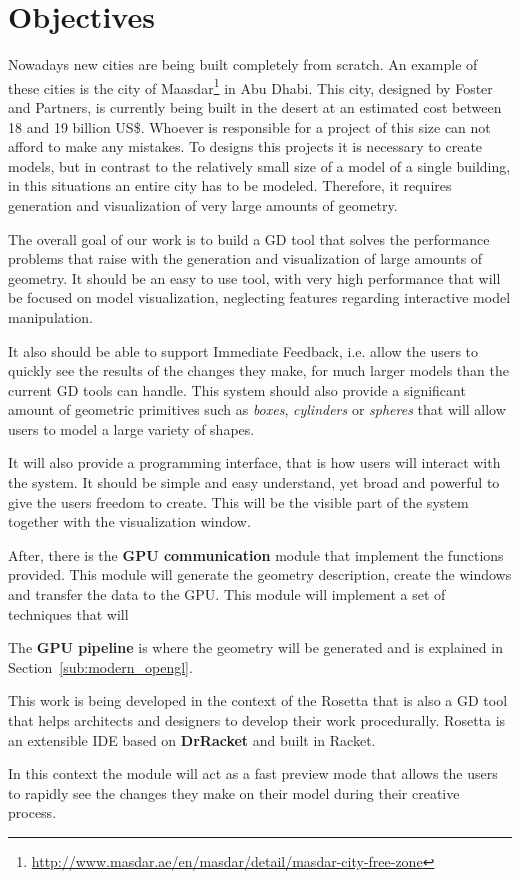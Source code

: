 
\section{Objectives} %
\label{sec:objectives}

Nowadays new cities are being built  completely from scratch. An example of these cities is the city of Maasdar\footnote{\url{http://www.masdar.ae/en/masdar/detail/masdar-city-free-zone}} in Abu Dhabi. This city, designed by Foster and Partners, is currently being built in the desert at an estimated cost between 18 and 19 billion US\$. Whoever is responsible for a project of this size can not afford to make any mistakes.
To designs this projects it is necessary to create models, but in contrast to the relatively small size of a model of a single building, in this situations an entire city has to be modeled. Therefore, it requires generation and visualization of very large amounts of geometry.

The overall goal of our work is to build a GD tool that solves the performance problems that raise with the generation and visualization of large amounts of geometry. It should be an easy to use tool, with very high performance that will be focused on model visualization, neglecting features regarding interactive model manipulation.

It also should be able to support Immediate Feedback, i.e. allow the users to quickly see the results of the changes they make, for much larger models than the current GD tools can handle. This system should also provide a significant amount of geometric primitives such as \emph{boxes}, \emph{cylinders} or \emph{spheres} that will allow users to model a large variety of shapes.

It will also provide a programming interface, that is how users will interact with the system. It should be simple and easy understand, yet broad and powerful to give the users freedom to create. This will be the visible part of the system together with the visualization window.

After, there is the \textbf{GPU communication} module that implement the functions provided. This module will generate the geometry description, create the windows and transfer the data to the GPU. This module will implement a set of techniques that will 

The \textbf{GPU pipeline} is where the geometry will be generated and is explained in Section~\ref{sub:modern_opengl}.

This work is being developed in the context of the Rosetta that is also a GD tool that helps architects and designers to develop their work procedurally. Rosetta is an extensible IDE based on \textbf{DrRacket} and built in Racket. 

In this context the module will act as a fast preview mode that allows the users to rapidly see the changes they make on their model during their creative process.

